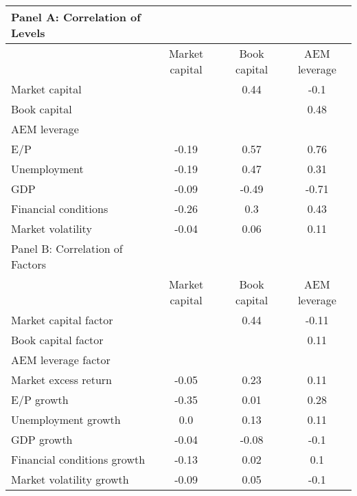
    \begin{table}[htbp]
    \centering
    \begin{adjustbox}{max width=\textwidth}
    \small
    \begin{tabular}{lccc}
        \toprule
        Panel A: Correlation of Levels \\
        \midrule
         & Market capital & Book capital & AEM leverage \\
        \midrule
        Market capital &  & 0.44 & -0.1 \\
Book capital &  &  & 0.48 \\
AEM leverage &  &  &  \\
E/P & -0.19 & 0.57 & 0.76 \\
Unemployment & -0.19 & 0.47 & 0.31 \\
GDP & -0.09 & -0.49 & -0.71 \\
Financial conditions & -0.26 & 0.3 & 0.43 \\
Market volatility & -0.04 & 0.06 & 0.11 \\
        \midrule
        Panel B: Correlation of Factors \\
        \midrule
         & Market capital & Book capital & AEM leverage \\
        \midrule
        Market capital factor &  & 0.44 & -0.11 \\
Book capital factor &  &  & 0.11 \\
AEM leverage factor &  &  &  \\
Market excess return & -0.05 & 0.23 & 0.11 \\
E/P growth & -0.35 & 0.01 & 0.28 \\
Unemployment growth & 0.0 & 0.13 & 0.11 \\
GDP growth & -0.04 & -0.08 & -0.1 \\
Financial conditions growth & -0.13 & 0.02 & 0.1 \\
Market volatility growth & -0.09 & 0.05 & -0.1 \\
        \bottomrule
    \end{tabular}
    \end{adjustbox}
    \end{table}
    